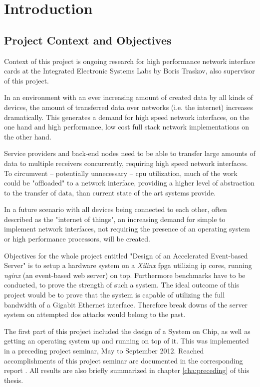 \chapter{Introduction}

\section{Project Context and Objectives}

Context of this project is ongoing research for high performance network interface cards at the Integrated Electronic Systems Labs by Boris Traskov, also supervisor of this project.

In an environment with an ever increasing amount of created data by all kinds of devices, the amount of transferred data over networks (i.e. the internet) increases dramatically. This generates a demand for high speed network interfaces, on the one hand and high performance, low cost full stack network implementations on the other hand. 

Service providers and back-end nodes need to be able to transfer large amounts of data to multiple receivers concurrently, requiring high speed network interfaces. To circumvent -- potentially unnecessary -- \gls{cpu} utilization, much of the work could be "offloaded" to a network interface, providing a higher level of abstraction to the transfer of data, than current state of the art systems provide.

In a future scenario with all devices being connected to each other, often described as the "internet of things", an increasing demand for simple to implement network interfaces, not requiring the presence of an operating system or high performance processors, will be created.

Objectives for the whole project entitled "Design of an Accelerated Event-based Server" is to setup a hardware system on a \textit{Xilinx} \gls{fpga} utilizing \gls{ip} cores, running \textit{nginx} (an event-based web server) on top. Furthermore benchmarks have to be conducted, to prove the strength of such a system. The ideal outcome of this project would be to prove that the system is capable of utilizing the full bandwidth of a Gigabit Ethernet interface. Therefore break downs of the server system on attempted \gls{dos} attacks would belong to the past.

The first part of this project included the design of a System on Chip, as well as getting an operating system up and running on top of it. This was implemented in a preceding project seminar, May to September 2012. Reached accomplishments of this project seminar are documented in the corresponding report \cite{projectseminar}. All results are also briefly summarized in chapter \ref{cha:preceding} of this thesis.

